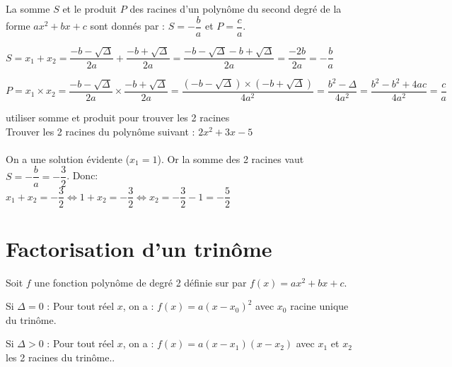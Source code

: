     \begin{propriete}
        La somme $S$ et le produit $P$ des racines d'un polynôme du second degré de la forme $ax^2+bx+c$ sont donnés par : $S=- \dfrac{b}{a}$  et $P= \dfrac{c}{a}$. 
    \end{propriete}
    
    \begin{demonstration}
        \begin{itemDem}
            \item $S=x_1+x_2=\dfrac{-b-\sqrt{\Delta}}{2a}+\dfrac{-b+\sqrt{\Delta}}{2a}=\dfrac{-b-\sqrt{\Delta}-b+\sqrt{\Delta}}{2a}=\dfrac{-2b}{2a}=- \dfrac{b}{a}$
            \item $P=x_1\times x_2=\dfrac{-b-\sqrt{\Delta}}{2a}\times \dfrac{-b+\sqrt{\Delta}}{2a}=\dfrac{(-b-\sqrt{\Delta})\times(-b+\sqrt{\Delta})}{4a^2}=\dfrac{b^2-\Delta}{4a^2}=\dfrac{b^2-b^2+4ac}{4a^2}=\dfrac{c}{a}$
        \end{itemDem}
    \end{demonstration}
    
    \begin{methodeTitre}{utiliser somme et produit pour trouver les 2 racines}
        \\
        Trouver les 2 racines du polynôme suivant : $2x^2+3x-5$\\
        \\
        On a une solution évidente ($x_1=1$). Or la somme des 2 racines vaut $S=- \dfrac{b}{a}=-\dfrac{3}{2}$. Donc:\\
        $x_1+x_2=-\dfrac{3}{2} \iff 1+x_2=-\dfrac{3}{2} \iff x_2=-\dfrac{3}{2}-1=-\dfrac{5}{2}$
    \end{methodeTitre}
        
    
\section{Factorisation d'un trinôme}

    \begin{propriete}
        Soit $f$ une fonction polynôme de degré 2 définie sur \R  par $f(x)=ax^2+bx+c$.
        \begin{itemDef}
            \item Si $\Delta = 0$ : Pour tout réel $x$, on a : $f(x)=a(x-x_0 )^2$ avec $x_0$ racine unique du trinôme.
            \item Si $\Delta > 0$ : Pour tout réel $x$, on a : $f(x)=a(x-x_1 )(x-x_2 )$ avec $x_1$ et $x_2$ les 2 racines du trinôme..
        \end{itemDef}
    \end{propriete}
    
